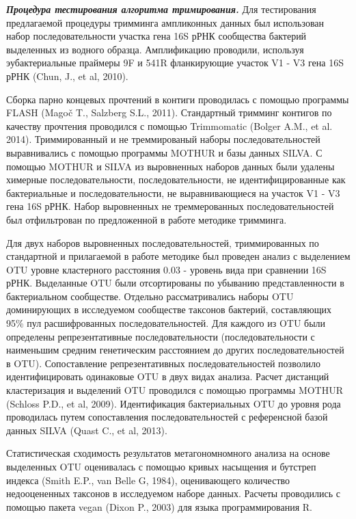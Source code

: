 \documentclass[a4paper,12pt,openany,final]{extreport}
\begin{document}
\emph{\textbf{Процедура тестирования алгоритма тримирования.}} Для
тестирования предлагаемой процедуры тримминга ампликонных данных был
использован набор последовательности участка гена 16S рРНК сообщества
бактерий выделенных из водного образца. Амплификацию проводили,
используя эубактериальные праймеры 9F и 541R фланкирующие участок V1 -
V3 гена 16S рРНК (Chun, J., et al, 2010).

Сборка парно концевых прочтений в контиги проводилась с помощью
программы FLASH (Magoč T., Salzberg S.L., 2011). Стандартный тримминг
контигов по качеству прочтения проводился с помощью Trimmomatic (Bolger
A.M., et al. 2014). Триммированный и не треммированый наборы
последовательностей выравнивались с помощью программы MOTHUR и базы
данных SILVA. С помощью MOTHUR и SILVA из выровненных наборов данных
были удалены химерные последовательности, последовательности, не
идентифицированные как бактериальные и последовательности, не
выравнивающиеся на участок V1 - V3 гена 16S рРНК. Набор выровненных не
треммерованных последовательностей был отфильтрован по предложенной в
работе методике тримминга.

Для двух наборов выровненных последовательностей, триммированных по
стандартной и прилагаемой в работе методике был проведен анализ с
выделением OTU уровне кластерного расстояния 0.03 - уровень вида при
сравнении 16S рРНК. Выделанные OTU были отсортированы по убыванию
представленности в бактериальном сообществе. Отдельно рассматривались
наборы OTU доминирующих в исследуемом сообществе таксонов бактерий,
составляющих 95\% пул расшифрованных последовательностей. Для каждого из
OTU были определены репрезентативные последовательности
(последовательности с наименьшим средним генетическим расстоянием до
других последовательностей в OTU). Сопоставление репрезентативных
последовательностей позволило идентифицировать одинаковые OTU в двух
видах анализа. Расчет дистанций кластеризация и выделений OTU проводился
с помощью программы MOTHUR (Schloss P.D., et al, 2009). Идентификация
бактериальных OTU до уровня рода проводилась путем сопоставления
последовательностей с референсной базой данных SILVA (Quast C., et al,
2013).

Статистическая сходимость результатов метагономномного анализа на основе
выделенных OTU оценивалась с помощью кривых насыщения и бутстреп индекса
(Smith E.P., van Belle G, 1984), оценивающего количество недооцененных
таксонов в исследуемом наборе данных. Расчеты проводились с помощью
пакета vegan (Dixon P., 2003) для языка программирования R.
\end{document}
